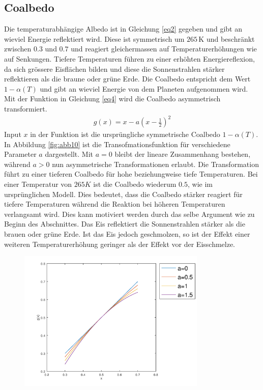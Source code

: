 \begin{refsection}
\subsection{Coalbedo} \label{sec:co}
Die temperaturabhängige Albedo ist in Gleichung \eqref{eq2} gegeben
und gibt an wieviel Energie reflektiert wird. Diese ist symmetrisch
um $265\,\text{K}$ und beschränkt zwischen $0.3$ und $0.7$ und reagiert
gleichermassen auf Temperaturerhöhungen wie auf Senkungen. Tiefere
Temperaturen führen zu einer erhöhten Energiereflexion, da sich
grössere Eisflächen bilden und diese die Sonnenstrahlen stärker
reflektieren als die braune oder grüne Erde. Die Coalbedo entspricht
dem Wert $1-\alpha(T)$ und gibt an wieviel Energie von dem Planeten
aufgenommen wird. Mit der Funktion in Gleichung \ref{eq4} wird die
Coalbedo asymmetrisch transformiert.
\begin{eqnarray} \label{eq4}
g(x)=x-a(x-\frac{1}{2})^2
\end{eqnarray}
Input $x$ in der Funktion ist die ursprüngliche symmetrische Coalbedo
$1-\alpha(T)$. In Abbildung \ref{fig:abb10} ist die Transofmationsfunktion
für verschiedene Parameter $a$ dargestellt. Mit $a=0$ bleibt der
lineare Zusammenhang bestehen, während $a>0$ nun asymmetrische
Transformationen erlaubt. Die Transformation führt zu einer tieferen
Coalbedo für hohe beziehungweise tiefe Temperaturen. Bei einer
Temperatur von $265 K$ ist die Coalbedo wiederum $0.5$, wie im
ursprünglichen Modell. Dies bedeutet, dass die Coalbedo stärker
reagiert für tiefere Temperaturen während die Reaktion bei höheren
Temperaturen verlangsamt wird. Dies kann motiviert werden durch das
selbe Argument wie zu Beginn des Abschnittes. Das Eis reflektiert
die Sonnenstrahlen stärker als die brauen oder grüne Erde. Ist das
Eis jedoch geschmolzen, so ist der Effekt einer weiteren
Temperaturerhöhung geringer als der Effekt vor der Eisschmelze.
%
\begin{figure}
	\centering
	\includegraphics[width= 0.8\textwidth]{neigung/Funktion.png}

\end{figure}
\end{refsection}
